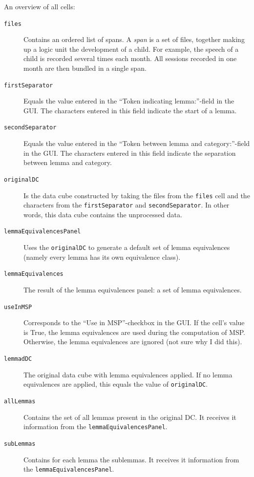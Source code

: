 \documentclass{article}
\begin{document}
An overview of all cells:
\begin{description}
\item[\texttt{files}] Contains an ordered list of spans. A \emph{span} is a set of files, together making up a logic unit the development of a child. For example, the speech of a child is recorded several times each month. All sessions recorded in one month are then bundled in a single span. 

\item[\texttt{firstSeparator}] Equals the value entered in the ``Token indicating lemma:''-field in the GUI. The characters entered in this field indicate the start of a lemma.

\item[\texttt{secondSeparator}] Equals the value entered in the ``Token between lemma and category:''-field in the GUI. The characters entered in this field indicate the separation between lemma and category. 

\item[\texttt{originalDC}] Is the data cube constructed by taking the files from the \texttt{files} cell and the characters from the \texttt{firstSeparator} and \texttt{secondSeparator}. In other words, this data cube contains the unprocessed data.

\item[\texttt{lemmaEquivalencesPanel}] Uses the \texttt{originalDC} to generate a default set of lemma equivalences (namely every lemma has its own equivalence class). 

\item[\texttt{lemmaEquivalences}] The result of the lemma equivalences panel: a set of lemma equivalences. 

\item[\texttt{useInMSP}] Corresponds to the ``Use in MSP''-checkbox in the GUI. If the cell's value is True, the lemma equivalences are used during the computation of MSP. Otherwise, the lemma equivalences are ignored (not sure why I did this).

\item[\texttt{lemmadDC}] The original data cube with lemma equivalences applied. If no lemma equivalences are applied, this equals the value of \texttt{originalDC}.

\item[\texttt{allLemmas}] Contains the set of all lemmas present in the original DC. It receives it information from the \texttt{lemmaEquivalencesPanel}. 

\item[\texttt{subLemmas}] Contains for each lemma the sublemmas. It receives it information from the \texttt{lemmaEquivalencesPanel}.


\end{description}
\end{document}
